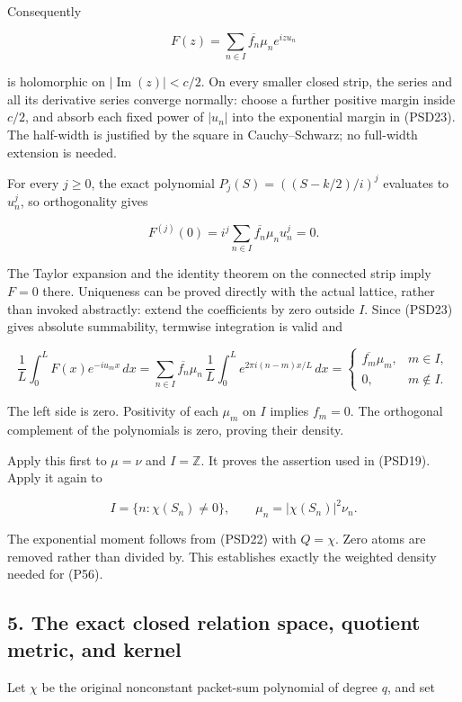 \documentclass{article}
\begin{document}
Consequently

\[
F(z)=\sum_{n\in I}\overline{f_n}\mu_ne^{izu_n}
\tag{PSD24}
\]

is holomorphic on \(|\operatorname{Im}(z)|<c/2\). On every smaller closed strip, the series and all its derivative series converge normally: choose a further positive margin inside \(c/2\), and absorb each fixed power of \(|u_n|\) into the exponential margin in (PSD23). The half-width is justified by the square in Cauchy--Schwarz; no full-width extension is needed.

For every \(j\ge 0\), the exact polynomial \(P_j(S)=((S-k/2)/i)^j\) evaluates to \(u_n^j\), so orthogonality gives

\[
F^{(j)}(0)=i^j\sum_{n\in I}\overline{f_n}\mu_nu_n^j=0.
\tag{PSD25}
\]

The Taylor expansion and the identity theorem on the connected strip imply \(F=0\) there. Uniqueness can be proved directly with the actual lattice, rather than invoked abstractly: extend the coefficients by zero outside \(I\). Since (PSD23) gives absolute summability, termwise integration is valid and

\[
\frac1L\int_0^L F(x)e^{-iu_mx}\,dx
=\sum_{n\in I}\overline{f_n}\mu_n\,
\frac1L\int_0^L e^{2\pi i(n-m)x/L}\,dx
=\begin{cases}\overline{f_m}\mu_m,&m\in I,\\0,&m\notin I.\end{cases}
\tag{PSD26}
\]

The left side is zero. Positivity of each \(\mu_m\) on \(I\) implies \(f_m=0\). The orthogonal complement of the polynomials is zero, proving their density.

Apply this first to \(\mu=\nu\) and \(I=\mathbb Z\). It proves the assertion used in (PSD19). Apply it again to

\[
I=\{n:\chi(S_n)\ne0\},\qquad
\mu_n=|\chi(S_n)|^2\nu_n.
\tag{PSD27}
\]

The exponential moment follows from (PSD22) with \(Q=\chi\). Zero atoms are removed rather than divided by. This establishes exactly the weighted density needed for (P56).

\subsection{5. The exact closed relation space, quotient metric, and kernel}\label{the-exact-closed-relation-space-quotient-metric-and-kernel}

Let \(\chi\) be the original nonconstant packet-sum polynomial of degree \(q\), and set
\end{document}
